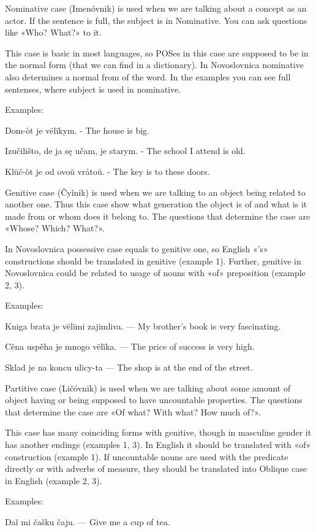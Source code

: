 Nominative case (Imenóvnik) is used when we are talking about a concept as an actor. If the sentence is full, the subject is in Nominative. You can ask questions like «Who? What?» to it.

This case is basic in most languages, so POSes in this case are supposed to be in the normal form (that we can find in a dictionary). In Novoslovnica nominative also determines a normal from of the word. In the examples you can see full sentenses, where subject is used in nominative.

Examples:

Dom-òt je vëlïkym. - The house is big.

Izučilišto, de ja sę učam, je starym. - The school I attend is old.

Klüč-òt je od ovoŭ vråtoŭ. - The key is to these doors.

Genitive case (Čyǐnik) is used when we are talking to an object being related to another one. Thus this case show what generation the object is of and what is it made from or whom does it belong to. The questions that determine the case are «Whose? Which? What?».

In Novoslovnica possessive case equals to genitive one, so English «'s» constructions should be translated in genitive (example 1). Further, genitive in Novoslovnica could be related to usage of nouns with «of» preposition (example 2, 3).

Examples:

Kniga brata je vëlïmi zajimliva. — My brother's book is very fascinating.

Cěna uspěha je mnogo vëlïka. — The price of success is very high.

Sklad je na koncu ulicy-ta — The shop is at the end of the street.

Partitive case (Ličóvnik) is used when we are talking about some amount of object having or being supposed to have uncountable properties. The questions that determine the case are «Of what? With what? How much of?».

This case has many coinciding forms with genitive, though in masculine gender it has another endings (examples 1, 3). In English it should be translated with «of» construction (example 1). If uncountable nouns are used with the predicate directly or with adverbs of measure, they should be translated into Oblique case in English (example 2, 3).

Examples:

Daǐ mi čašku čaju. — Give me a cup of tea.

